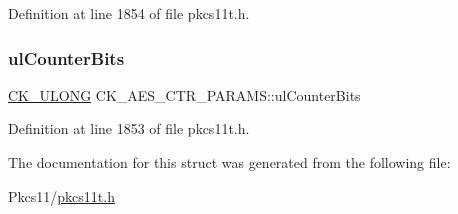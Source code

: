 Definition at line 1854 of file pkcs11t.\+h.

\mbox{\label{struct_c_k___a_e_s___c_t_r___p_a_r_a_m_s_a54e9e91f82b31a9cbe343adaa31e3a3a}} 
\subsubsection{\texorpdfstring{ul\+Counter\+Bits}{ulCounterBits}}
{\footnotesize\ttfamily \hyperlink{pkcs11t_8h_a35181858a3b7a0a81f49d180d8f446ef}{C\+K\+\_\+\+U\+L\+O\+NG} C\+K\+\_\+\+A\+E\+S\+\_\+\+C\+T\+R\+\_\+\+P\+A\+R\+A\+M\+S\+::ul\+Counter\+Bits}



Definition at line 1853 of file pkcs11t.\+h.



The documentation for this struct was generated from the following file\+:\begin{DoxyCompactItemize}
\item 
Pkcs11/\hyperlink{pkcs11t_8h}{pkcs11t.\+h}\end{DoxyCompactItemize}
